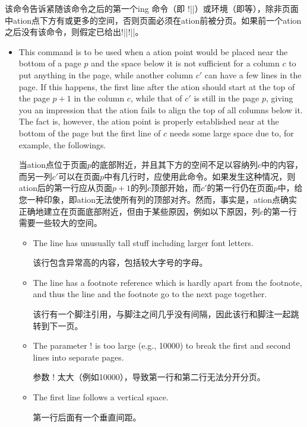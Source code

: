 \begin{description}
该命令告诉紧随该命令之后的第一个\sync{}ing \cswitch{}命令（即 \!\switchcolumn!||）或环境（即等），除非页面中\sync{}ation点下方有或更多的空间，否则页面必须在\sync{}ation前被分页。如果前一个\sync{}ation之后没有该命令，则假定已给出\!\ensurevspace!|{|\!\baselineskip!|}|。

\begin{itemize}
\item
This command is to be used when a \sync{}ation point would be placed near
the bottom of a page $p$ and the space below it is not sufficient for a column
$c$ to put anything in the page, while another column $c'$ can have a few
lines in the page.  If this happens, the first line after the \sync{}ation
should start at the top of the page $p+1$ in the column $c$, while that of
$c'$ is still in the page $p$, giving you an impression that the
\sync{}ation fails to align the top of all columns below it.  The fact is,
however, the \sync{}ation point is properly established near at the bottom
of the page but the first line of $c$ needs some large space due to, for
example, the followings.

当\sync{}ation点位于页面$p$的底部附近，并且其下方的空间不足以容纳列$c$中的内容，而另一列$c'$可以在页面$p$中有几行时，应使用此命令。如果发生这种情况，则\sync{}ation后的第一行应从页面$p+1$的列$c$顶部开始，而$c'$的第一行仍在页面$p$中，给您一种印象，即\sync{}ation无法使所有列的顶部对齐。然而，事实是，\sync{}ation点确实正确地建立在页面底部附近，但由于某些原因，例如以下原因，列$c$的第一行需要一些较大的空间。

\begin{itemize}
\item
The line has unusually tall stuff including larger font letters.

该行包含异常高的内容，包括较大字号的字母。
\item
The line has a footnote reference which is hardly apart from the
footnote, and thus the line and the footnote go to the next page together.

该行有一个脚注引用，与脚注之间几乎没有间隔，因此该行和脚注一起跳转到下一页。
\item
The parameter \!\clubpenalty! is too large (e.g., 10000) to break the
first and second lines into separate pages.

参数 \!\clubpenalty! 太大（例如10000），导致第一行和第二行无法分开分页。
\item
The first line follows a vertical space.

第一行后面有一个垂直间距。
\end{itemize}


\end{itemize}
\end{description}
